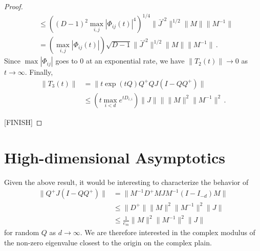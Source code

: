 \documentclass[twoside]{article}
\numberwithin{equation}{section}
\newcommand{\tr}{\mbox{Tr}}
\begin{document}
\begin{proof}
\begin{align*}
	&\leq \left( (D-1)^2 \max_{i,j} |\Phi_{ij}(t)|^4 \right)^{1/4}   \lVert \bar{J}^{\circ 2} \rVert^{1/2}   \lVert M \rVert \lVert M^{-1}  \rVert  \\
	&= \left( \max_{i,j} |\Phi_{ij}(t)| \right)\sqrt{D-1} \lVert \bar{J}^{\circ 2} \rVert^{1/2}   \lVert M \rVert \lVert M^{-1}  \rVert  \, .
\end{align*}
Since $\max |\Phi_{ij}|$ goes to 0 at an exponential rate, we have $\lVert T_2(t)\rVert \rightarrow 0$ as $t\rightarrow \infty$.  Finally,
\begin{align*}
	\lVert T_3(t) \rVert &= \lVert t \exp(tQ) Q^+ Q J( I - QQ^+)  \rVert \\
	&\leq \left(t \max_{i<d} e^{tD_{i,i}} \right) \lVert J \rVert  \rVert \lVert M \rVert^2 \lVert M^{-1} \rVert^2 \, .
\end{align*}
 


[FINISH]
\end{proof}

\section{High-dimensional Asymptotics}


Given the above result, it would be interesting to characterize the behavior of 
\begin{align*}
\lVert	Q^+ J (I-QQ^+)  \rVert &= \lVert M^{-1}D^+M J M^{-1} (I-I_{-d}) M \rVert \\
&\leq \lVert D^+ \rVert \lVert M\rVert^2 \lVert M^{-1}\rVert^2 \lVert J \rVert  \\
&\leq \frac{1}{e_m}\lVert M\rVert^2 \lVert M^{-1}\rVert^2 \lVert J \rVert  
\end{align*}
for random $Q$ as $d\rightarrow \infty$.  We are therefore interested in the complex modulus of the non-zero eigenvalue closest to the origin on the complex plain. 
\end{document}
